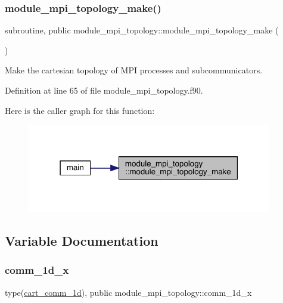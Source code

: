 \subsubsection{\texorpdfstring{module\_mpi\_topology\_make()}{module\_mpi\_topology\_make()}}
{\footnotesize\ttfamily subroutine, public module\+\_\+mpi\+\_\+topology\+::module\+\_\+mpi\+\_\+topology\+\_\+make (\begin{DoxyParamCaption}{ }\end{DoxyParamCaption})}



Make the cartesian topology of M\+PI processes and subcommunicators. 



Definition at line 65 of file module\+\_\+mpi\+\_\+topology.\+f90.

Here is the caller graph for this function\+:\nopagebreak
\begin{figure}[H]
\begin{center}
\leavevmode
\includegraphics[width=303pt]{namespacemodule__mpi__topology_a162ac095bb487254991dd12ad5ac8935_icgraph}
\end{center}
\end{figure}


\subsection{Variable Documentation}
\mbox{\label{namespacemodule__mpi__topology_a8fc7176d4696d255810403b7fedf475c}} 
\subsubsection{\texorpdfstring{comm\_1d\_x}{comm\_1d\_x}}
{\footnotesize\ttfamily type(\mbox{\hyperlink{structmodule__mpi__topology_1_1cart__comm__1d}{cart\+\_\+comm\+\_\+1d}}), public module\+\_\+mpi\+\_\+topology\+::comm\+\_\+1d\+\_\+x}



